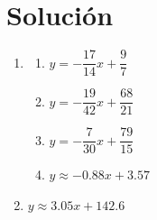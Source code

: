 \documentclass[12pt,letterpaper]{article}
\begin{document}
\newpage

\section*{Solución}


\begin{enumerate}
    \item
    \begin{enumerate}
        \item $y = -\dfrac{17}{14}x + \dfrac{9}{7}$
        \item $y = -\dfrac{19}{42}x + \dfrac{68}{21}$
        \item $y = -\dfrac{7}{30}x + \dfrac{79}{15}$
        \item $y \approx -0.88x + 3.57$
    \end{enumerate}

    \item $y \approx 3.05x + 142.6$

\end{enumerate}
\end{document}
